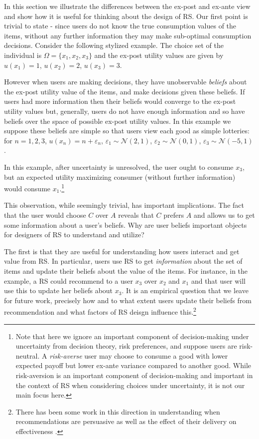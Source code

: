 \documentclass[sigconf]{acmart}
\begin{document}
In this section we illustrate the differences between the ex-post and ex-ante view and show how it is useful for thinking about the design of RS. Our first point is trivial to state - since users do not know the true consumption values of the items, without any further information they may make sub-optimal consumption decisions. Consider the following stylized example. The choice set of the individual is $\Omega= \{x_1, x_2, x_3 \}$ and the ex-post utility values are given by
$u(x_1) = 1$, $u(x_2) = 2$, $u(x_3) = 3$. 
\par
However when users are making decisions, they have unobservable \textit{beliefs} about the ex-post utility value of the items, and make decisions given these beliefs. If users had more information then their beliefs would converge to the ex-post utility values but, generally, users do not have enough information and so have beliefs over the space of possible ex-post utility values. In this example we suppose these beliefs are simple so that users view each good as simple lotteries: for $n=1,2,3$, $u(x_n) = n + \varepsilon_n$, $\varepsilon_1 \sim \mathcal N (2, 1)$, $\varepsilon_2 \sim \mathcal N (0, 1)$, $\varepsilon_3 \sim \mathcal N (-5, 1)$.
\par
In this example, after uncertainty is unresolved, the user ought to consume $x_3$, but an expected utility maximizing consumer (without further information) would consume $x_1$.\footnote{Note that here we ignore an important component of decision-making under uncertainty from decision theory, risk preferences, and suppose users are risk-neutral. A \textit{risk-averse} user may choose to consume a good with lower expected payoff but lower ex-ante variance compared to another good. While risk-aversion is an important component of decision-making and important in the context of RS when considering choices under uncertainty, it is not our main focus here.}
\par
This observation, while seemingly trivial, has important implications. The fact that the user would choose $C$ over $A$ reveals that $C$ prefers $A$ and allows us to get some information about a user's beliefs. Why are user beliefs important objects for designers of RS to understand and utilize?
\par
The first is that they are useful for understanding how users interact and get value from RS. In particular, users use RS to get \textit{information} about the set of items and update their beliefs about the value of the items. For instance, in the example, a RS could recommend to a user $x_3$ over $x_2$ and $x_1$ and that user will use this to update her beliefs about $x_3$. It is an empirical question that we leave for future work, precisely how and to what extent users update their beliefs from recommendation and what factors of RS deisgn influence this.\footnote{There has been some work in this direction in understanding when recommendations are persuasive \cite{cremonesi2012investigating, gretzel2006persuasion} as well as the effect of their delivery on effectiveness \cite{murphy2014recommendation}.}
\end{document}
